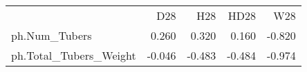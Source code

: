 \begin{tabular}{lrrrr}
 & D28 & H28 & HD28 & W28 \\
ph.Num_Tubers & {\cellcolor[HTML]{E7C7C5}} \color[HTML]{000000} 0.260 & {\cellcolor[HTML]{E2BCB9}} \color[HTML]{000000} 0.320 & {\cellcolor[HTML]{F0DBDA}} \color[HTML]{000000} 0.160 & {\cellcolor[HTML]{5782BC}} \color[HTML]{F1F1F1} -0.820 \\
ph.Total_Tubers_Weight & {\cellcolor[HTML]{F7F4F4}} \color[HTML]{000000} -0.046 & {\cellcolor[HTML]{9FB0CC}} \color[HTML]{000000} -0.483 & {\cellcolor[HTML]{9FB0CC}} \color[HTML]{000000} -0.484 & {\cellcolor[HTML]{2C6DBC}} \color[HTML]{F1F1F1} -0.974 \\
\end{tabular}
